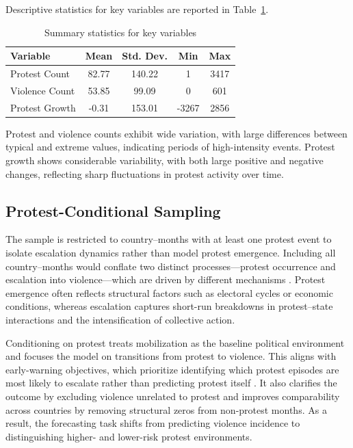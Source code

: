 \documentclass[12pt]{article}
\begin{document}
Descriptive statistics for key variables are reported in Table~\ref{tab:summary_stats}.

\begin{table}[h!]
\centering
\caption{Summary statistics for key variables}
\label{tab:summary_stats}
\begin{tabular}{lcccc}
\toprule
Variable & Mean & Std. Dev. & Min & Max \\
\midrule
Protest Count & 82.77 & 140.22 & 1 & 3417 \\
Violence Count & 53.85 & 99.09 & 0 & 601 \\
Protest Growth & -0.31 & 153.01 & -3267 & 2856 \\
\bottomrule
\end{tabular}
\end{table}

Protest and violence counts exhibit wide variation, with large differences between typical and extreme values, indicating periods of high-intensity events. Protest growth shows considerable variability, with both large positive and negative changes, reflecting sharp fluctuations in protest activity over time.


\subsection{Protest-Conditional Sampling}

The sample is restricted to country–months with at least one protest event to isolate escalation dynamics rather than model protest emergence. Including all country–months would conflate two distinct processes—protest occurrence and escalation into violence—which are driven by different mechanisms \citep{mueller2024conflict}. Protest emergence often reflects structural factors such as electoral cycles or economic conditions, whereas escalation captures short-run breakdowns in protest–state interactions and the intensification of collective action.

Conditioning on protest treats mobilization as the baseline political environment and focuses the model on transitions from protest to violence. This aligns with early-warning objectives, which prioritize identifying which protest episodes are most likely to escalate rather than predicting protest itself \citep{hegre2019views}. It also clarifies the outcome by excluding violence unrelated to protest and improves comparability across countries by removing structural zeros from non-protest months. As a result, the forecasting task shifts from predicting violence incidence to distinguishing higher- and lower-risk protest environments.
\end{document}
